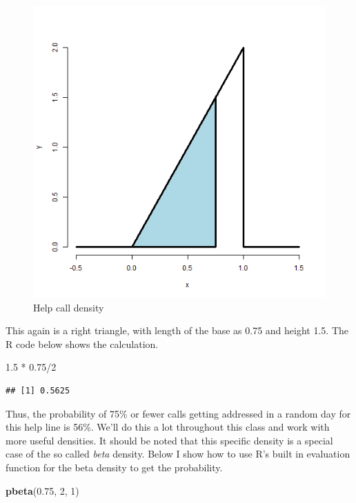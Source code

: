 \documentclass[]{article}
\newenvironment{Shaded}{\begin{snugshade}}{\end{snugshade}}
\newcommand{\KeywordTok}[1]{\textcolor[rgb]{0.13,0.29,0.53}{\textbf{{#1}}}}
\newcommand{\DecValTok}[1]{\textcolor[rgb]{0.00,0.00,0.81}{{#1}}}
\newcommand{\FloatTok}[1]{\textcolor[rgb]{0.00,0.00,0.81}{{#1}}}
\newcommand{\StringTok}[1]{\textcolor[rgb]{0.31,0.60,0.02}{{#1}}}
\newcommand{\NormalTok}[1]{{#1}}
\begin{document}
\begin{figure}[htbp]
\centering
\includegraphics{LeanPub/images/triangleDensityArea-1.png}
\caption{Help call density}
\end{figure}

This again is a right triangle, with length of the base as 0.75 and
height 1.5. The R code below shows the calculation.

\begin{Shaded}
\begin{Highlighting}[]
\FloatTok{1.5} \NormalTok{*}\StringTok{ }\FloatTok{0.75}\NormalTok{/}\DecValTok{2}
\end{Highlighting}
\end{Shaded}

\begin{verbatim}
## [1] 0.5625
\end{verbatim}

Thus, the probability of 75\% or fewer calls getting addressed in a
random day for this help line is 56\%. We'll do this a lot throughout
this class and work with more useful densities. It should be noted that
this specific density is a special case of the so called \emph{beta}
density. Below I show how to use R's built in evaluation function for
the beta density to get the probability.

\begin{Shaded}
\begin{Highlighting}[]
\KeywordTok{pbeta}\NormalTok{(}\FloatTok{0.75}\NormalTok{, }\DecValTok{2}\NormalTok{, }\DecValTok{1}\NormalTok{)}
\end{Highlighting}
\end{Shaded}
\end{document}
